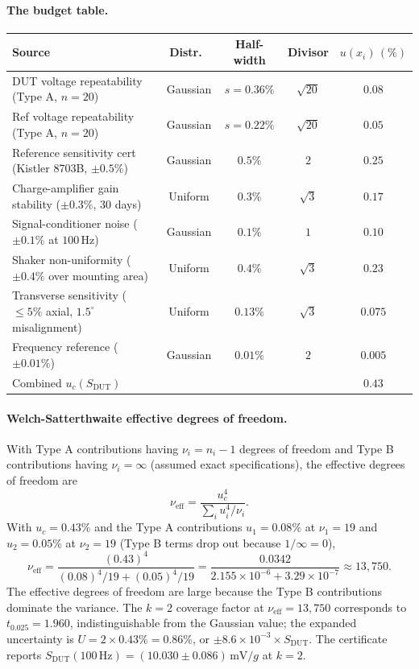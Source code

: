 \paragraph{The budget table.}

\begin{center}
\small
\begin{tabular}{lcccc}
\toprule
Source & Distr.\ & Half-width & Divisor & $u(x_{i})\,(\%)$ \\
\midrule
DUT voltage repeatability (Type A, $n = 20$) & Gaussian & $s = 0.36\%$ & $\sqrt{20}$ & $0.08$ \\
Ref voltage repeatability (Type A, $n = 20$) & Gaussian & $s = 0.22\%$ & $\sqrt{20}$ & $0.05$ \\
Reference sensitivity cert (Kistler 8703B, $\pm 0.5\%$) & Gaussian & $0.5\%$ & $2$ & $0.25$ \\
Charge-amplifier gain stability ($\pm 0.3\%$, $30$ days) & Uniform & $0.3\%$ & $\sqrt{3}$ & $0.17$ \\
Signal-conditioner noise ($\pm 0.1\%$ at $100\,\si{\hertz}$) & Gaussian & $0.1\%$ & $1$ & $0.10$ \\
Shaker non-uniformity ($\pm 0.4\%$ over mounting area) & Uniform & $0.4\%$ & $\sqrt{3}$ & $0.23$ \\
Transverse sensitivity ($\leq 5\%$ axial, $1.5^{\circ}$ misalignment) & Uniform & $0.13\%$ & $\sqrt{3}$ & $0.075$ \\
Frequency reference ($\pm 0.01\%$) & Gaussian & $0.01\%$ & $2$ & $0.005$ \\
\midrule
Combined $u_{c}(S_{\text{DUT}})$ & & & & $0.43$ \\
\bottomrule
\end{tabular}
\end{center}

\paragraph{Welch-Satterthwaite effective degrees of freedom.}
With Type A contributions having $\nu_{i} = n_{i} - 1$ degrees
of freedom and Type B contributions having
$\nu_{i} = \infty$ (assumed exact specifications), the
effective degrees of freedom are
\[
\nu_{\text{eff}} = \frac{u_{c}^{4}}{\sum_{i} u_{i}^{4}/\nu_{i}}.
\]
With $u_{c} = 0.43\%$ and the Type A contributions
$u_{1} = 0.08\%$ at $\nu_{1} = 19$ and $u_{2} = 0.05\%$ at
$\nu_{2} = 19$ (Type B terms drop out because $1/\infty = 0$),
\[
\nu_{\text{eff}} = \frac{(0.43)^{4}}{(0.08)^{4}/19 + (0.05)^{4}/19}
= \frac{0.0342}{2.155 \times 10^{-6} + 3.29 \times 10^{-7}}
\approx 13{,}750.
\]
The effective degrees of freedom are large because the Type B
contributions dominate the variance. The $k = 2$ coverage
factor at $\nu_{\text{eff}} = 13{,}750$ corresponds to
$t_{0.025} = 1.960$, indistinguishable from the Gaussian value;
the expanded uncertainty is $U = 2 \times 0.43\% = 0.86\%$, or
$\pm 8.6 \times 10^{-3} \times S_{\text{DUT}}$. The certificate
reports $S_{\text{DUT}}(100\,\si{\hertz}) = (10.030 \pm
0.086)\,\si{\milli\volt}/g$ at $k = 2$.

